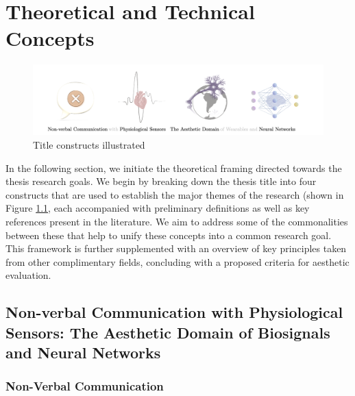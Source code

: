 

\chapter{Theoretical and Technical Concepts}
\label{cha:technical_concepts}

\begin{figure}[htbp]
	\centering
	\includegraphics[width=\textwidth]{Chapters/Figures/background/sec2_title_constructs_alpha_2.png}
	\caption{Title constructs illustrated}
	\label{fig:title_constructs}
\end{figure}

In the following section, we initiate the theoretical framing directed towards the thesis research goals. We begin by breaking down the thesis title into four constructs that are used to establish the major themes of the research (shown in Figure \ref{fig:title_constructs}, each accompanied with preliminary definitions as well as key references present in the literature. We aim to address some of the commonalities between these that help to unify these concepts into a common research goal. This framework is further supplemented with an overview of key principles taken from other complimentary fields, concluding with a proposed criteria for aesthetic evaluation.

\section{Non-verbal Communication with Physiological Sensors: The Aesthetic Domain of Biosignals and Neural Networks}
\label{sec:title_constructs}


\subsection{Non-Verbal Communication}

